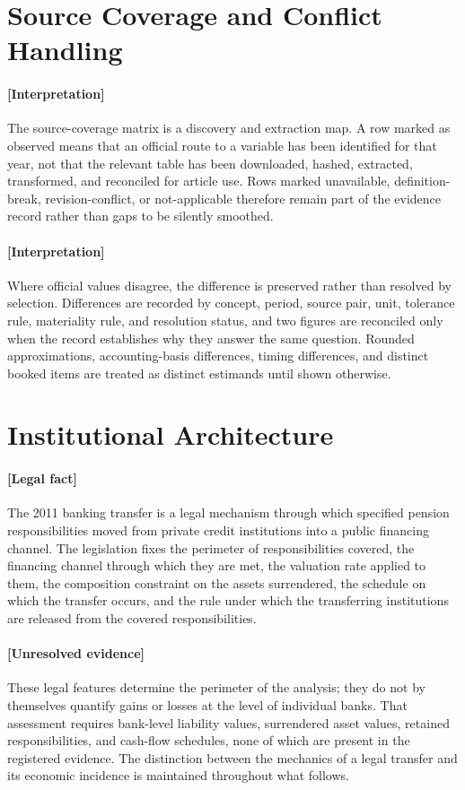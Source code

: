 \documentclass[11pt]{article}
\begin{document}
\section{Source Coverage and Conflict Handling}
\label{sec:coverage}
\paragraph{[Interpretation]}
The source-coverage matrix is a discovery and extraction map. A row marked as observed means that an official route to a variable has been identified for that year, not that the relevant table has been downloaded, hashed, extracted, transformed, and reconciled for article use. Rows marked unavailable, definition-break, revision-conflict, or not-applicable therefore remain part of the evidence record rather than gaps to be silently smoothed.

\paragraph{[Interpretation]}
Where official values disagree, the difference is preserved rather than resolved by selection. Differences are recorded by concept, period, source pair, unit, tolerance rule, materiality rule, and resolution status, and two figures are reconciled only when the record establishes why they answer the same question. Rounded approximations, accounting-basis differences, timing differences, and distinct booked items are treated as distinct estimands until shown otherwise.

\section{Institutional Architecture}
\label{sec:architecture}
\paragraph{[Legal fact]}
The 2011 banking transfer is a legal mechanism through which specified pension responsibilities moved from private credit institutions into a public financing channel. The legislation fixes the perimeter of responsibilities covered, the financing channel through which they are met, the valuation rate applied to them, the composition constraint on the assets surrendered, the schedule on which the transfer occurs, and the rule under which the transferring institutions are released from the covered responsibilities.

\paragraph{[Unresolved evidence]}
These legal features determine the perimeter of the analysis; they do not by themselves quantify gains or losses at the level of individual banks. That assessment requires bank-level liability values, surrendered asset values, retained responsibilities, and cash-flow schedules, none of which are present in the registered evidence. The distinction between the mechanics of a legal transfer and its economic incidence is maintained throughout what follows.
\end{document}

